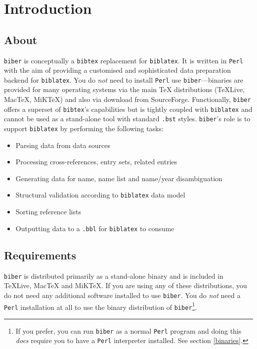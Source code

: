 \documentclass{ltxdockit}
\begin{document}
\printtitlepage
\tableofcontents

\section{Introduction}
\label{int}

\subsection{About}

\verb+biber+ is conceptually a \verb+bibtex+ replacement for
\verb+biblatex+. It is written in \verb+Perl+ with the aim of providing a
customised and sophisticated data preparation backend for \verb+biblatex+.
You do \emph{not} need to install \verb+Perl+ use \verb+biber+---binaries
are provided for many operating systems via the main TeX
distributions (TeXLive, MacTeX, MiKTeX) and also via download from SourceForge.
Functionally, \verb+biber+ offers a superset of \verb+bibtex+'s capabilities but is
tightly coupled with \verb+biblatex+ and cannot be used as a stand-alone tool
with standard \verb+.bst+ styles. \verb+biber+'s role is to support
\verb+biblatex+ by performing the following tasks:

\begin{itemize}
\item Parsing data from data sources
\item Processing cross-references, entry sets, related entries
\item Generating data for name, name list and name/year disambiguation
\item Structural validation according to \verb+biblatex+ data model
\item Sorting reference lists
\item Outputting data to a \verb+.bbl+ for \verb+biblatex+ to consume
\end{itemize}

\subsection{Requirements}\label{ref:req}

\verb+biber+ is distributed primarily as a stand-alone binary and is
included in TeXLive, MacTeX and MiKTeX. If you are using any of these
distributions, you do not need any additional software installed to use
\verb+biber+. You do \emph{not} need a \verb+Perl+ installation at all to use
the binary distribution of \verb+biber+\footnote{If you prefer, you can run
\texttt{biber} as a normal \texttt{Perl} program and doing this \emph{does} require
you to have a \texttt{Perl} interpreter installed. See section \ref{binaries}.}.
\end{document}
